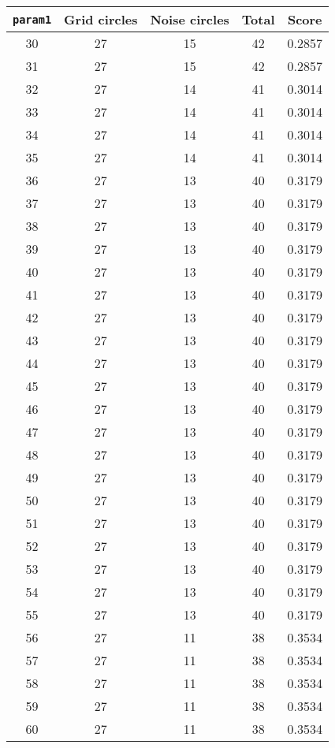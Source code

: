 \documentclass[letterpaper, 12pt]{article}
\begin{document}
\begin{longtable}{|c|c|c|c|c|}
\hline
\textbf{\texttt{param1}} & \textbf{Grid circles} & \textbf{Noise circles} & \textbf{Total} & \textbf{Score} \\
\hline
30 & 27 & 15 & 42 & 0.2857 \\
\hline
31 & 27 & 15 & 42 & 0.2857 \\
\hline
32 & 27 & 14 & 41 & 0.3014 \\
\hline
33 & 27 & 14 & 41 & 0.3014 \\
\hline
34 & 27 & 14 & 41 & 0.3014 \\
\hline
35 & 27 & 14 & 41 & 0.3014 \\
\hline
36 & 27 & 13 & 40 & 0.3179 \\
\hline
37 & 27 & 13 & 40 & 0.3179 \\
\hline
38 & 27 & 13 & 40 & 0.3179 \\
\hline
39 & 27 & 13 & 40 & 0.3179 \\
\hline
40 & 27 & 13 & 40 & 0.3179 \\
\hline
41 & 27 & 13 & 40 & 0.3179 \\
\hline
42 & 27 & 13 & 40 & 0.3179 \\
\hline
43 & 27 & 13 & 40 & 0.3179 \\
\hline
44 & 27 & 13 & 40 & 0.3179 \\
\hline
45 & 27 & 13 & 40 & 0.3179 \\
\hline
46 & 27 & 13 & 40 & 0.3179 \\
\hline
47 & 27 & 13 & 40 & 0.3179 \\
\hline
48 & 27 & 13 & 40 & 0.3179 \\
\hline
49 & 27 & 13 & 40 & 0.3179 \\
\hline
50 & 27 & 13 & 40 & 0.3179 \\
\hline
51 & 27 & 13 & 40 & 0.3179 \\
\hline
52 & 27 & 13 & 40 & 0.3179 \\
\hline
53 & 27 & 13 & 40 & 0.3179 \\
\hline
54 & 27 & 13 & 40 & 0.3179 \\
\hline
55 & 27 & 13 & 40 & 0.3179 \\
\hline
56 & 27 & 11 & 38 & 0.3534 \\
\hline
57 & 27 & 11 & 38 & 0.3534 \\
\hline
58 & 27 & 11 & 38 & 0.3534 \\
\hline
59 & 27 & 11 & 38 & 0.3534 \\
\hline
60 & 27 & 11 & 38 & 0.3534 \\

\end{longtable}
\end{document}
